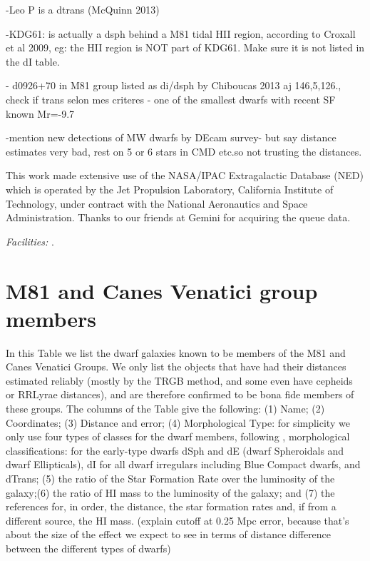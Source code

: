 \documentclass[12pt,preprint]{emulateapj}
\begin{document}
-Leo P is a dtrans (McQuinn 2013)

-KDG61: is actually a dsph behind a M81 tidal HII region, according to Croxall et al 2009, eg: the HII region is NOT part of KDG61. Make sure it is not listed in the dI table.


- d0926+70 in M81 group listed as di/dsph by Chiboucas 2013 aj 146,5,126., check if trans selon mes criteres - one of the smallest dwarfs with recent SF known Mr=-9.7

-mention new detections of MW dwarfs by DEcam survey- but say distance estimates very bad, rest on 5 or 6 stars in CMD etc.so not trusting the distances.

\acknowledgments

This work made extensive use of the NASA/IPAC Extragalactic Database (NED) which is operated by the Jet Propulsion Laboratory, California Institute of Technology, 
under contract with the National Aeronautics and Space Administration. Thanks to our friends at Gemini for acquiring the queue data.


{\it Facilities:}  .


\appendix

\section{M81 and Canes Venatici group members}

In this Table we list the dwarf galaxies known to be members of the M81 and Canes Venatici Groups. We only list the objects 
that have had their distances estimated reliably (mostly by the TRGB method, and some even have cepheids or RRLyrae distances), 
and are therefore confirmed to be bona fide members of these groups. The columns of the Table give the following:
(1) Name; (2) Coordinates; (3) Distance and error; (4) Morphological Type:  
for simplicity we only use four types of classes for the dwarf members, following \citep{m98},\citep{w11} 
morphological classifications: for the early-type dwarfs dSph and dE  
(dwarf Spheroidals and dwarf Ellipticals), dI for all dwarf irregulars including Blue
Compact dwarfs, and dTrans; (5) the ratio of the Star Formation Rate over the luminosity 
of the galaxy;(6) the ratio of HI mass to the luminosity of the galaxy; and (7) the references for, 
in order, the distance, the star formation rates and, if from a different source, the HI mass. 
(explain cutoff at 0.25 Mpc error, because that's about the size of the effect we expect to see in terms of distance difference between the different types of dwarfs)
\end{document}
